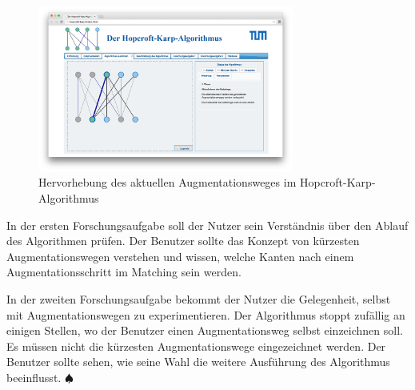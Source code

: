 \begin{figure}[h!]
	\centering
	\includegraphics[width=0.75\textwidth]{figures/hopcroft_karp_augmentation}
	\caption[Hopcroft-Karp: Augmentationsweg]{Hervorhebung des aktuellen Augmentationsweges im Hopcroft-Karp-Algorithmus}\label{fig:hopcroft_karp_augmentation}
\end{figure}

In der ersten Forschungsaufgabe soll der Nutzer sein Verständnis über den Ablauf des Algorithmen prüfen. Der Benutzer sollte das Konzept von kürzesten Augmentationswegen verstehen und wissen, welche Kanten nach einem Augmentationsschritt im Matching sein werden.

In der zweiten Forschungsaufgabe bekommt der Nutzer die Gelegenheit, selbst mit Augmentationswegen zu experimentieren. Der Algorithmus stoppt zufällig an einigen Stellen, wo der Benutzer einen Augmentationsweg selbst einzeichnen soll. Es müssen nicht die kürzesten Augmentationswege eingezeichnet werden. Der Benutzer sollte sehen, wie seine Wahl die weitere Ausführung des Algorithmus beeinflusst. \hfill$\spadesuit$

